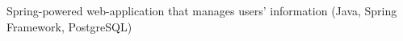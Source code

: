 \documentclass[10pt,a4paper,ragged2e,withhyper]{altacv}
\begin{document}
\begin{paracol}{2}






Spring-powered web-application that manages users' information (Java, Spring Framework, PostgreSQL)










\end{paracol}
\end{document}

